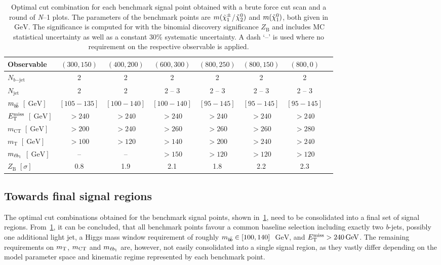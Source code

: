 \begin{table}
	\begin{center}
	\small
			\begin{tabular} {l c c c c c c c}
				\toprule
				Observable &  $(300,150)$ & $(400,200)$ & $(600,300)$  & $(800,250)$ & $(800,150)$ & $(800,0)$ \\
				\midrule
				$N_{b\mathrm{-jet}}$ &  2 & 2 & 2 & 2 & 2 & 2 \\
				$N_\mathrm{jet}$ & 2 & 2 & 2 -- 3 & 2 -- 3  & 2 -- 3 & 2 -- 3\\
				$m_{b\hspace{-0.06em}\bar{b}}$  $[\SI{}{\GeV}]$& $[105-135]$ & $[100-140]$ & $[100-140]$ & $[95-145]$ & $[95-145]$ & $[95-145]$ \\
				$E_{\textrm{T}}^{\textrm{miss}}$ $[\SI{}{\GeV}]$ & $>240$ & $>240$ & $>240$ & $>240$ & $>240$  & $>240$\\
				$m_\mathrm{CT}$ $[\SI{}{\GeV}]$ &  $>200$ & $>240$ & $>260$ & $>260$ & $>260$   & $>280$ \\
				$m_\mathrm{T}$ $[\SI{}{\GeV}]$ &  $>100$ & $>120$ & $>140$ & $>200$ & $>240$ & $>240$ \\
				$m_{\ell b_{1}}$ $[\SI{}{\GeV}]$ &  -- & -- & $>150$ & $>120$ & $>120$ & $>120$ \\
				\midrule
				$Z_\mathrm{B}$ $[\sigma]$ & \multicolumn{1}{c}{0.8} & \multicolumn{1}{c}{1.9} & \multicolumn{1}{c}{2.1} & \multicolumn{1}{c}{1.8} & \multicolumn{1}{c}{2.2} & \multicolumn{1}{c}{2.3} \\
				\bottomrule
			\end{tabular}
		\caption{Optimal cut combination for each benchmark signal point obtained with a brute force cut scan and a round of \textit{N}--1 plots. The parameters of the benchmark points are $m(\tilde{\chi}_1^\pm$/$\tilde{\chi}_2^0)$ and $m(\tilde{\chi}_1^0)$, both given in $\SI{}{\GeV}$. The significance is computed for \onethirtynineifb with the binomial discovery significance $Z_\mathrm{B}$ and includes MC statistical uncertainty as well as a constant 30\% systematic uncertainty. A dash `--' is used where no requirement on the respective observable is applied.}
		\label{tab:cut_scan_results}
	\end{center}
\end{table}




\subsection{Towards final signal regions}\label{sec:towards_signal_regions}

The optimal cut combinations obtained for the benchmark signal points, shown in~\cref{tab:cut_scan_results}, need to be consolidated into a final set of signal regions.
From~\cref{tab:cut_scan_results}, it can be concluded, that all benchmark points favour a common baseline selection including exactly two \textit{b}-jets, possibly one additional light jet, a Higgs mass window requirement of roughly $m_{b\hspace{-0.06em}\bar{b}}\in [100,140]$~$\SI{}{\GeV}$, and $\etmiss > \SI{240}{\GeV}$.
The remaining requirements on $m_{\textrm{T}}$, $m_{\textrm{CT}}$ and $m_{\ell b_{1}}$ are, however, not easily consolidated into a single signal region, as they vastly differ depending on the model parameter space and kinematic regime represented by each benchmark point.

